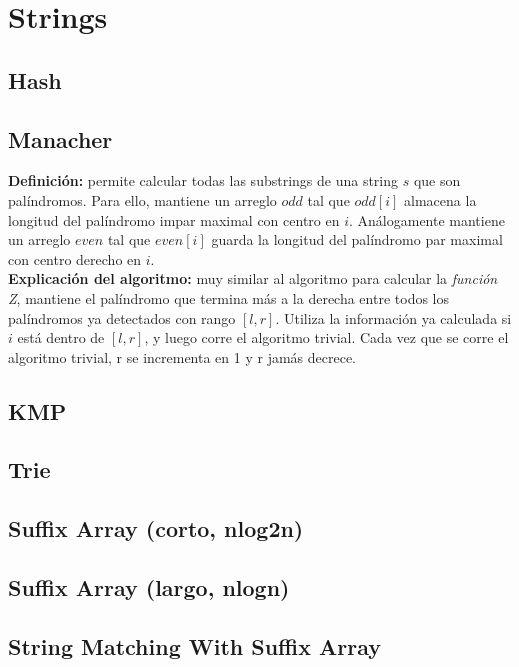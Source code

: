 \section{Strings}%
\subsection{Hash}
\subsection{Manacher}
\textbf{Definición:} permite calcular todas las substrings
de una string $s$ que son palíndromos.
Para ello, mantiene un arreglo $odd$ tal que $odd[i]$ 
almacena la longitud del palíndromo impar maximal con centro en $i$. 
Análogamente mantiene un arreglo $even$ tal que $even[i]$ guarda la 
longitud del palíndromo par maximal con centro derecho en $i$. \\
\textbf{Explicación del algoritmo:} muy similar al algoritmo para calcular
la \emph{función Z}, mantiene el palíndromo que termina más a la derecha
entre todos los palíndromos ya detectados con rango $[l, r]$. Utiliza la 
información ya calculada si $i$ está dentro de $[l, r]$, y luego corre
el algoritmo trivial. Cada vez que se corre el algoritmo trivial, r se 
incrementa en 1 y r jamás decrece.\\
\subsection{KMP}
\subsection{Trie}
\subsection{Suffix Array (corto, nlog2n)}
\subsection{Suffix Array (largo, nlogn)}
\subsection{String Matching With Suffix Array}
